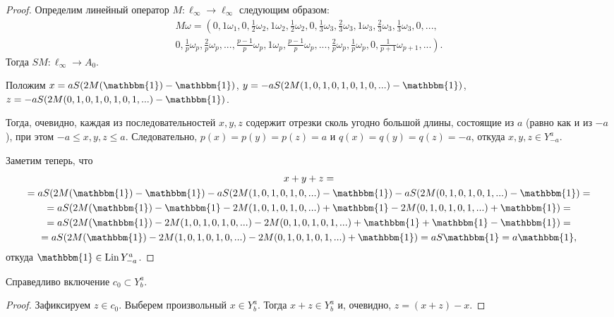 \begin{proof}
	Определим линейный оператор $M:\ell_\infty \to \ell_\infty$ следующим образом:
	\begin{multline}
		M\omega=\left(
			0, 1\omega_1,
			0, \frac{1}{2}\omega_2, 1\omega_2, \frac{1}{2}\omega_2,
			0, \frac{1}{3}\omega_3, \frac{2}{3}\omega_3, 1\omega_3, \frac{2}{3}\omega_3, \frac{1}{3}\omega_3,
			0, ...,
		\right. \\ \left.
			0, \frac{1}{p}\omega_p, \frac{2}{p}\omega_p, ..., \frac{p-1}{p}\omega_p, 1\omega_p,
				\frac{p-1}{p}\omega_p, ..., \frac{2}{p}\omega_p, \frac{1}{p}\omega_p,
			0, \frac{1}{p+1}\omega_{p+1}, ...
		\right)
		.
	\end{multline}
	Тогда $SM: \ell_\infty \to A_0$.

	Положим $x=aS(2M(\mathbbm{1})-\mathbbm{1})$,
	$y=-aS(2M(1,0,1,0,1,0,1,0,...)-\mathbbm{1})$,
	$z=-aS(2M(0,1,0,1,0,1,0,1,...)-\mathbbm{1})$.

	Тогда, очевидно, каждая из последовательностей $x,y,z$ содержит отрезки сколь угодно большой длины,
	состоящие из $a$ (равно как и из $-a$), при этом $-a \leq x,y,z \leq a$.
	Следовательно, $p(x)=p(y)=p(z) = a$ и $q(x)=q(y)=q(z) = -a$,
	откуда $x,y,z \in Y^a_{-a}$.

	Заметим теперь, что
	\begin{multline}
		x + y + z
		=
		\\=
		aS(2M(\mathbbm{1})-\mathbbm{1}) - aS(2M(1,0,1,0,1,0,...)-\mathbbm{1}) - aS(2M(0,1,0,1,0,1,...)-\mathbbm{1})
		=
		\\=
		aS(2M(\mathbbm{1})-\mathbbm{1}  -    2M(1,0,1,0,1,0,...)+\mathbbm{1}  -    2M(0,1,0,1,0,1,...)+\mathbbm{1})
		=
		\\=
		aS(2M(\mathbbm{1}) - 2M(1,0,1,0,1,0,...) - 2M(0,1,0,1,0,1,...)+\mathbbm{1}+\mathbbm{1}-\mathbbm{1})
		=
		\\=
		aS(2M(\mathbbm{1}) - 2M(1,0,1,0,1,0,...) - 2M(0,1,0,1,0,1,...)+\mathbbm{1})
		=
		aS\mathbbm{1}
		=
		a\mathbbm{1}
		,
	\end{multline}
	откуда $\mathbbm{1} \in \operatorname{Lin} Y^a_{-a}$.
\end{proof}


\begin{lemma}
	\label{lem:c_0_Lin_alpha_0}
	Справедливо включение $c_0 \subset Y^a_b$.
\end{lemma}

\begin{proof}
	Зафиксируем $z\in c_0$.
	Выберем произвольный $x \in Y^a_b$.
	Тогда $x+z\in Y^a_b$ и, очевидно, $z=(x+z)-x$.
\end{proof}

